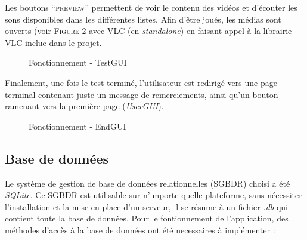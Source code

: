 Les boutons ``\textsc{preview}'' permettent de voir le contenu des vidéos et d'écouter les sons disponibles dans les différentes listes. Afin d'être joués, les médias sont ouverts (voir \textsc{Figure} \ref{VLC} avec VLC (en \textit{standalone}) en faisant appel à la librairie VLC inclue dans le projet.

\begin{figure}[!ht]
\begin{center}
  \caption{Fonctionnement - TestGUI}
  \label{VLC} 
\end{center}
\end{figure}

Finalement, une fois le test terminé, l'utilisateur est redirigé vers une page terminal contenant juste un message de remerciements, ainsi qu'un bouton ramenant vers la première page (\textit{UserGUI}).

\begin{figure}[!ht]
\begin{center}
  \caption{Fonctionnement - EndGUI}
  \label{VLC} 
\end{center}
\end{figure}

\subsection{Base de données}\label{BDD}

Le système de gestion de base de données relationnelles (SGBDR) choisi a été \textit{SQLite}. Ce SGBDR est utilisable sur n'importe quelle plateforme, sans nécessiter l'installation et la mise en place d'un serveur, il se résume à un fichier \textit{.db} qui contient toute la base de données.
Pour le fontionnement de l'application, des méthodes d'accès à la base de données ont été necessaires à implémenter :


